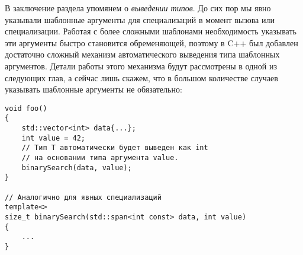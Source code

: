 В заключение раздела упомянем о \textit{выведении типов}. До сих пор мы явно указывали шаблонные аргументы для специализаций в момент вызова или специализации. Работая с более сложными шаблонами необходимость указывать эти аргументы быстро становится обременяющей, поэтому в C++ был добавлен достаточно сложный механизм автоматического выведения типа шаблонных аргументов. Детали работы этого механизма будут рассмотрены в одной из следующих глав, а сейчас лишь скажем, что в большом количестве случаев указывать шаблонные аргументы не обязательно:
\begin{verbatim}
void foo()
{
    std::vector<int> data{...};
    int value = 42;
    // Тип T автоматически будет выведен как int
    // на основании типа аргумента value.
    binarySearch(data, value);
}

// Аналогично для явных специализаций 
template<>
size_t binarySearch(std::span<int const> data, int value)
{
    ...
}
\end{verbatim}

